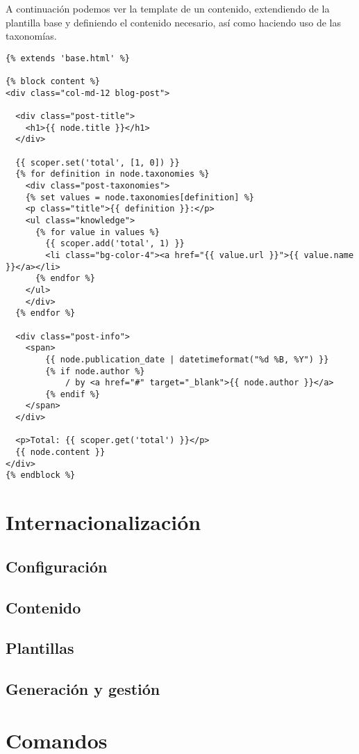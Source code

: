 A continuación podemos ver la template de un contenido, extendiendo de la plantilla base y definiendo
el contenido necesario, así como haciendo uso de las taxonomías.

\begin{verbatim}
{% extends 'base.html' %}

{% block content %}
<div class="col-md-12 blog-post">

  <div class="post-title">
    <h1>{{ node.title }}</h1>
  </div>

  {{ scoper.set('total', [1, 0]) }}
  {% for definition in node.taxonomies %}
    <div class="post-taxonomies">
    {% set values = node.taxonomies[definition] %}
    <p class="title">{{ definition }}:</p>
    <ul class="knowledge">
      {% for value in values %}
        {{ scoper.add('total', 1) }}
        <li class="bg-color-4"><a href="{{ value.url }}">{{ value.name }}</a></li>
      {% endfor %}
    </ul>
    </div>
  {% endfor %}

  <div class="post-info">
    <span>
        {{ node.publication_date | datetimeformat("%d %B, %Y") }}
        {% if node.author %}
            / by <a href="#" target="_blank">{{ node.author }}</a>
        {% endif %}
    </span>
  </div>

  <p>Total: {{ scoper.get('total') }}</p>
  {{ node.content }}
</div>
{% endblock %}
\end{verbatim}


\section{Internacionalización}

\subsection{Configuración}
\subsection{Contenido}
\subsection{Plantillas}
\subsection{Generación y gestión}


\section{Comandos}


